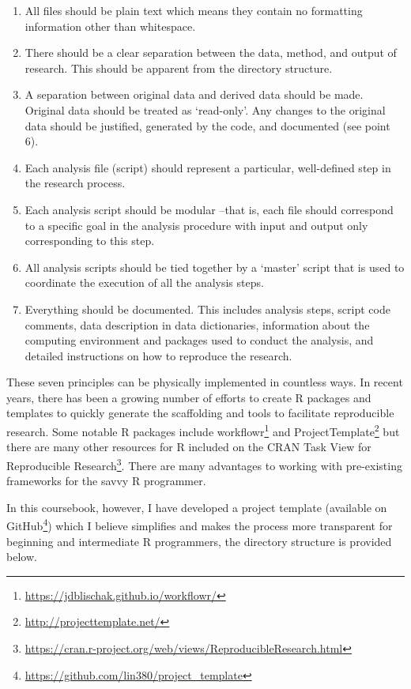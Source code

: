 \documentclass[
  letterpaper,
]{scrbook}
\providecommand{\tightlist}{%
  \setlength{\itemsep}{0pt}\setlength{\parskip}{0pt}}\usepackage{longtable,booktabs,array}
\DeclareRobustCommand{\href}[2]{#2\footnote{\url{#1}}}
\begin{document}
\begin{enumerate}
\def\labelenumi{\arabic{enumi}.}
\tightlist
\item
  All files should be plain text which means they contain no formatting
  information other than whitespace.
\item
  There should be a clear separation between the data, method, and
  output of research. This should be apparent from the directory
  structure.
\item
  A separation between original data and derived data should be made.
  Original data should be treated as `read-only'. Any changes to the
  original data should be justified, generated by the code, and
  documented (see point 6).
\item
  Each analysis file (script) should represent a particular,
  well-defined step in the research process.
\item
  Each analysis script should be modular --that is, each file should
  correspond to a specific goal in the analysis procedure with input and
  output only corresponding to this step.
\item
  All analysis scripts should be tied together by a `master' script that
  is used to coordinate the execution of all the analysis steps.
\item
  Everything should be documented. This includes analysis steps, script
  code comments, data description in data dictionaries, information
  about the computing environment and packages used to conduct the
  analysis, and detailed instructions on how to reproduce the research.
\end{enumerate}

These seven principles can be physically implemented in countless ways.
In recent years, there has been a growing number of efforts to create R
packages and templates to quickly generate the scaffolding and tools to
facilitate reproducible research. Some notable R packages include
\href{https://jdblischak.github.io/workflowr/}{workflowr} and
\href{http://projecttemplate.net/}{ProjectTemplate} but there are many
other resources for R included on the
\href{https://cran.r-project.org/web/views/ReproducibleResearch.html}{CRAN
Task View for Reproducible Research}. There are many advantages to
working with pre-existing frameworks for the savvy R programmer.

In this coursebook, however, I have developed a project template
(\href{https://github.com/lin380/project_template}{available on GitHub})
which I believe simplifies and makes the process more transparent for
beginning and intermediate R programmers, the directory structure is
provided below.
\end{document}
